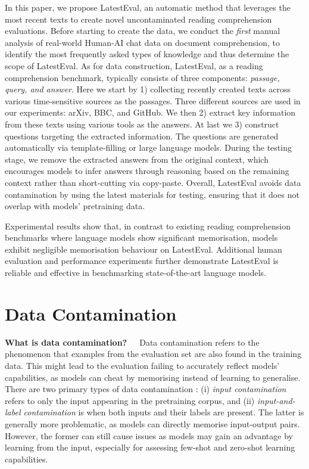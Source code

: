 \documentclass[letterpaper]{article} %
\begin{document}
In this paper, we propose LatestEval, an automatic method that leverages the most recent texts to create novel uncontaminated reading comprehension evaluations. Before starting to create the data, we conduct the \textit{first} manual analysis of real-world Human-AI chat data on document comprehension, to identify the most frequently asked types of knowledge and thus determine the scope of LatestEval.
As for data construction, LatestEval, as a reading comprehension benchmark, typically consists of three components: \textit{passage, query, and answer}. Here we start by 1) collecting recently created texts across various time-sensitive sources as the passages. Three different sources are used in our experiments: arXiv, BBC, and GitHub. We then 2) extract key information from these texts using various tools as the answers. At last we 3) construct questions targeting the extracted information. The questions are generated automatically via template-filling or large language models. During the testing stage, we remove the extracted answers from the original context, which encourages models to infer answers through reasoning based on the remaining context rather than short-cutting via copy-paste. Overall, LatestEval avoids data contamination by using the latest materials for testing, ensuring that it does not overlap with models' pretraining data.

Experimental results show that, in contrast to existing reading comprehension benchmarks where language models show significant memorisation, models exhibit negligible memorisation behaviour on LatestEval. Additional human evaluation and performance experiments further demonstrate LatestEval is reliable and effective in benchmarking state-of-the-art language models.

\section{Data Contamination}

\noindent\textbf{What is data contamination?}~~~Data contamination refers to the phenomenon that examples from the evaluation set are also found in the training data. This might lead to the evaluation failing to accurately reflect models' capabilities, as models can cheat by memorising instead of learning to generalise. There are two primary types of data contamination \cite{dodge2021documenting}: (i) \textit{input contamination} refers to only the input appearing in the pretraining corpus, and (ii) \textit{input-and-label contamination} is when both inputs and their labels are present. The latter is generally more problematic, as models can directly memorise input-output pairs. However, the former can still cause issues as models may gain an advantage by learning from the input, 
especially for assessing few-shot and zero-shot learning capabilities.
\end{document}
